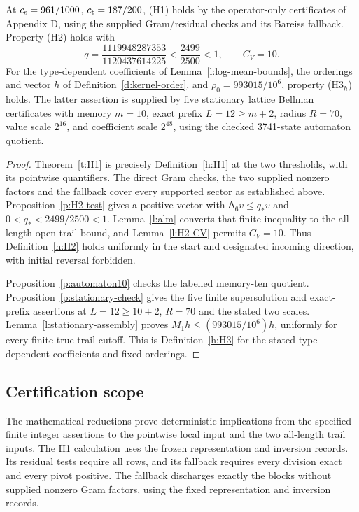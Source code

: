 \begin{theorem}\label{t:inputs}
At \(c_{\rm s}=961/1000\), \(c_{\rm t}=187/200\), (H1) holds
by the operator-only certificates of Appendix D, using the supplied
Gram/residual checks and its Bareiss fallback.
Property (H2) holds with
\[
 q=\frac{1119948287353}{1120437614225}<\frac{2499}{2500}<1,
 \qquad C_V=10 .
\]
For the type-dependent coefficients of Lemma~\ref{l:log-mean-bounds},
the orderings and vector \(h\) of Definition~\ref{d:kernel-order},
and \(\rho_0=993015/10^6\), property (H3\(_h\)) holds.
The latter assertion is supplied by five stationary lattice Bellman
certificates with memory \(m=10\), exact prefix \(L=12\ge m+2\),
radius \(R=70\), value scale \(2^{16}\), and coefficient scale
\(2^{48}\), using the checked 3741-state automaton quotient.
\end{theorem}

\begin{proof}
Theorem~\ref{t:H1} is precisely Definition~\ref{h:H1} at the two
thresholds, with its pointwise quantifiers. The direct Gram checks,
the two supplied nonzero factors and the fallback cover every
supported sector as established above.
Proposition~\ref{p:H2-test} gives a positive vector with
\(\mathsf A_6v\le q_*v\) and \(0<q_*<2499/2500<1\).
Lemma~\ref{l:alm} converts that finite inequality to the all-length
open-trail bound, and Lemma~\ref{l:H2-CV} permits \(C_V=10\).
Thus Definition~\ref{h:H2} holds uniformly in the start and
designated incoming direction, with initial reversal forbidden.

Proposition~\ref{p:automaton10} checks the labelled memory-ten
quotient. Proposition~\ref{p:stationary-check} gives the five
finite supersolution and exact-prefix assertions at
\(L=12\ge10+2\), \(R=70\) and the stated two scales.
Lemma~\ref{l:stationary-assembly} proves
\(M_1h\le(993015/10^6)h\), uniformly for every finite
true-trail cutoff. This is Definition~\ref{h:H3} for the stated
type-dependent coefficients and fixed orderings.
\end{proof}

\subsection*{Certification scope}
The mathematical reductions prove deterministic implications from
the specified finite integer assertions to the pointwise local
input and the two all-length trail inputs. The H1 calculation uses
the frozen representation and inversion records. Its residual
tests require all rows, and its fallback requires every division
exact and every pivot positive. The fallback discharges exactly
the blocks without supplied nonzero Gram factors, using the fixed
representation and inversion records.

